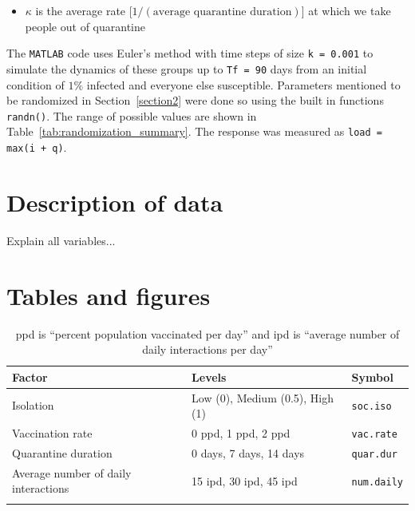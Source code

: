 \documentclass[12pt,a4paper]{article}
\begin{document}
\begin{appendices}
\begin{itemize}
	\vspace*{-3mm}
	\item $\kappa$ is the average rate [$1/(\text{average quarantine duration})$] at which we take people out of quarantine
\end{itemize}
The \verb`MATLAB` code uses Euler's method with time steps of size \verb`k = 0.001` to simulate the dynamics of these groups up to \verb`Tf = 90` days from an initial condition of $1\%$ infected and everyone else susceptible. Parameters mentioned to be randomized in Section~\ref{section2} were done so using the built in functions \verb`randn()`. The range of possible values are shown in Table~\ref{tab:randomization_summary}. The response was measured as \verb`load = max(i + q)`.

\section{Description of data}\label{appendixB}
Explain all variables...

\section{Tables and figures}\label{appendixC}

\begin{table}[H]
    \centering
    \begin{tabular}{l l l}\hline
         Factor &  Levels & Symbol \\ \hline\hline
         Isolation & Low (0), Medium (0.5), High (1) & \verb`soc.iso` \\ \hline
         Vaccination rate & 0 \si{ppd}, 1 \si{ppd}, 2 \si{ppd} & \verb`vac.rate` \\ \hline
         Quarantine duration & 0 days, 7 days, 14 days & \verb`quar.dur`\\ \hline
         Average number of daily interactions & 15 \si{ipd}, 30 \si{ipd}, 45 \si{ipd} & \verb`num.daily` \\ \hline \\
    \end{tabular}
    \caption{\si{ppd} is ``percent population vaccinated per day'' and \si{ipd} is ``average number of daily interactions per day''}
    \label{tab:factor_summary}
\end{table}


\end{appendices}
\end{document}

